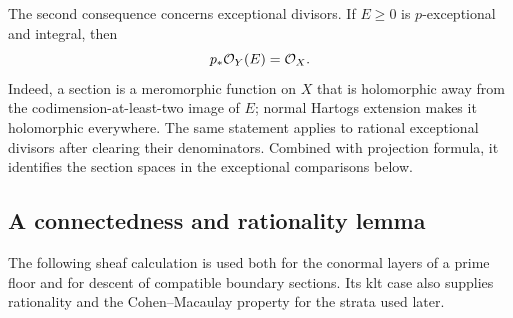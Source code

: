 The second consequence concerns exceptional divisors.  If \(E\geq0\)
is \(p\)-exceptional and integral, then
\begin{equation}
 p_*\mathcal O_Y(E)=\mathcal O_X. \label{eq:exceptional-hartogs}
\end{equation}
Indeed, a section is a meromorphic function on \(X\) that is holomorphic
away from the codimension-at-least-two image of \(E\); normal Hartogs
extension makes it holomorphic everywhere.  The same statement applies
to rational exceptional divisors after clearing their denominators.
Combined with projection formula, it identifies the section spaces in
the exceptional comparisons below.

\subsection{A connectedness and rationality lemma}

The following sheaf calculation is used both for the conormal layers of
a prime floor and for descent of compatible boundary sections.  Its klt
case also supplies rationality and the Cohen--Macaulay property for the
strata used later.

